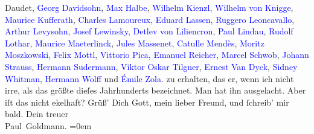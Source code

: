{{{{                     Daudet}, \textcolor{blue}{Georg Davidsohn}, \textcolor{blue}{Max Halbe}, \textcolor{blue}{Wilhelm Kienzl}, \textcolor{blue}{Wilhelm von
                  Knigge}, \textcolor{blue}{Maurice Kufferath}, \textcolor{blue}{Charles Lamoureux}, \textcolor{blue}{Eduard Lassen}, \textcolor{blue}{Ruggero
                     Leoncavallo}, \textcolor{blue}{Arthur Levysohn}, \textcolor{blue}{Josef Lewinsky}, \textcolor{blue}{Detlev von Liliencron}, \textcolor{blue}{Paul Lindau}, \textcolor{blue}{Rudolf Lothar}, \textcolor{blue}{Maurice Maeterlinck}, \textcolor{blue}{Jules Massenet}, \textcolor{blue}{Catulle
                     Mendès}, \textcolor{blue}{Moritz Moszkowski}, \textcolor{blue}{Felix Mottl}, \textcolor{blue}{Vittorio Pica}, \textcolor{blue}{Emanuel
                     Reicher}, \textcolor{blue}{Marcel Schwob}, \textcolor{blue}{Johann Strauss}, \textcolor{blue}{Hermann Sudermann}, \textcolor{blue}{Viktor Oskar Tilgner}, \textcolor{blue}{Ernest Van
                     Dyck}, \textcolor{blue}{Sidney Whitman}, \textcolor{blue}{Hermann Wolff} und \textcolor{blue}{Émile Zola}.}}}\label{K_L02737-8h} zu erhalten, das er, wenn ich nicht
               irre, als das größte dieſes Jahrhunderts bezeichnet. Man hat ihn ausgelacht. Aber iſt
               das nicht ekelhaft?\pend
           \pstart
           Grüß’ Dich Gott, mein lieber Freund, und ſchreib’ mir bald.\pend
           \pstart
           Dein treuer{\\[\baselineskip]}\spacefill\mbox{Paul Goldmann.}\pend
           \leftskip=0em{}\endnumbering{}\begin{anhang}\end{anhang}
      